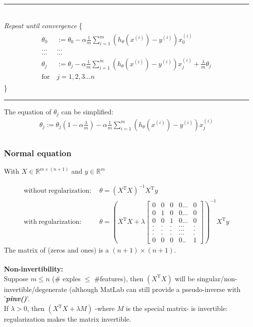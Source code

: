 \documentclass[a4paper,12pt]{report}
\begin{document}
\noindent\rule{\linewidth}{0.4pt} 
\\ \textit{Repeat until convergence} \{
\begin{align*}
\begin{split}
\theta_0  &:= \theta_0 - \alpha\frac{1}{m} \sum_{i=1} ^{m} \left( h_{\theta}(x^{(i)})-y^{(i)}\right) x_{0}^{(i)}\\
... & ...\\
... & ...\\
\theta_j  &:= \theta_j - \alpha\frac{1}{m} \sum_{i=1} ^{m} \left( h_{\theta}(x^{(i)})-y^{(i)}\right) x_{j}^{(i)} + \frac{\lambda}{m} \theta_j\\
\mathrm{for \ }  &  j=1,2,3...n
\end{split}
\end{align*}
\} \\
\noindent\rule{\linewidth}{0.4pt}
The equation of $\theta_j$ can be simplified:
\begin{align*}
\theta_j  := \theta_j\left(1- \alpha\frac{\lambda}{m} \right) - \alpha\frac{1}{m} \sum_{i=1} ^{m} \left( h_{\theta}(x^{(i)})-y^{(i)}\right) x_{j}^{(i)} \\
\end{align*}

\subsubsection{Normal equation}
With $X \in \mathbb{R}^{m \times (n+1)} $ and $y\in \mathbb{R}^{m}$

\begin{align*}
\mathrm{without \ regularization:\ } & \theta = \left(X^{\mathrm{T}}X \right)^{-1} X^{\mathrm{T}} y\\
 \mathrm{with \ regularization:\ } & \theta = \left(X^{\mathrm{T}}X + \lambda \left[\begin{smallmatrix} 0&0&0&0...&0\\0&1&0&0...&0\\0&0&1&0...&0\\.&.&.&...&.\\.&.&.&...&.\\.&.&.&...&.\\0&0&0&0..&1 \end{smallmatrix} \right]\right)^{-1} X^{\mathrm{T}} y 
\end{align*}
The matrix of (zeros and ones) is a $(n+1) \times (n+1)$. \\ \\

\textbf{Non-invertibility:} \\
Suppose $m \leq n$ (\# exples $\leq$ \#features), then $(X^{\mathrm{T}}X)$ will be singular/non-invertible/degenerate (although MatLab can still provide a pseudo-inverse with '\textbf{\textit{pinv()}}'.
\\
If $\lambda > 0$, then $(X^{\mathrm{T}}X + \lambda M)$ -where $M$ is the special matrix- is invertible: regularization makes the matrix invertible.
\end{document}

